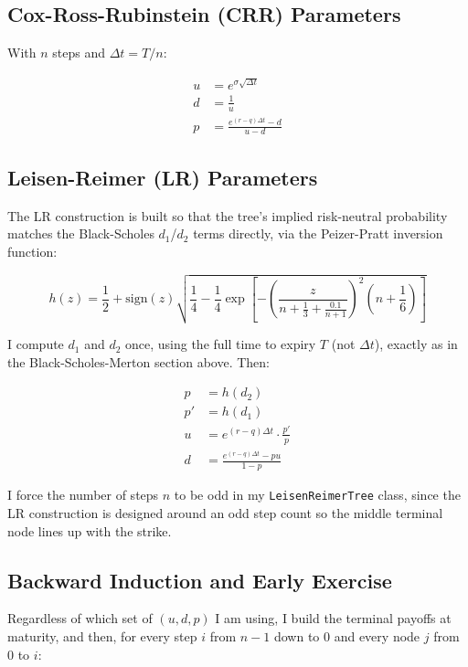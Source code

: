 \documentclass[12pt,a4paper]{article}
\begin{document}
\subsection{Cox-Ross-Rubinstein (CRR) Parameters}

With $n$ steps and $\Delta t = T/n$:

\begin{align}
u &= e^{\sigma\sqrt{\Delta t}} \\
d &= \frac{1}{u} \\
p &= \frac{e^{(r-q)\Delta t} - d}{u - d}
\end{align}

\subsection{Leisen-Reimer (LR) Parameters}

The LR construction is built so that the tree's implied risk-neutral
probability matches the Black-Scholes $d_1$/$d_2$ terms directly, via the
Peizer-Pratt inversion function:

\begin{equation}
h(z) = \frac{1}{2} + \text{sign}(z)\sqrt{\frac{1}{4} - \frac{1}{4}\exp\left[-\left(\frac{z}{n + \frac{1}{3} + \frac{0.1}{n+1}}\right)^2 \left(n + \frac{1}{6}\right)\right]}
\end{equation}

I compute $d_1$ and $d_2$ once, using the full time to expiry $T$ (not
$\Delta t$), exactly as in the Black-Scholes-Merton section above. Then:

\begin{align}
p &= h(d_2) \\
p' &= h(d_1) \\
u &= e^{(r-q)\Delta t} \cdot \frac{p'}{p} \\
d &= \frac{e^{(r-q)\Delta t} - pu}{1-p}
\end{align}

I force the number of steps $n$ to be odd in my \texttt{LeisenReimerTree}
class, since the LR construction is designed around an odd step count so
the middle terminal node lines up with the strike.

\subsection{Backward Induction and Early Exercise}

Regardless of which set of $(u, d, p)$ I am using, I build the terminal
payoffs at maturity, and then, for every step $i$ from $n-1$ down to $0$
and every node $j$ from $0$ to $i$:
\end{document}
